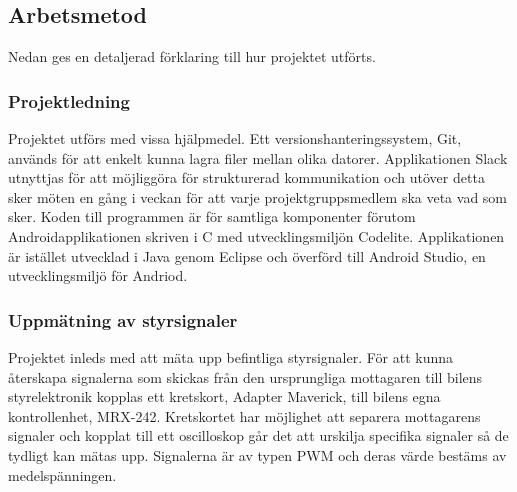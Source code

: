 \documentclass[a4paper]{article}
\begin{document}

\subsection{Arbetsmetod}
Nedan ges en detaljerad förklaring till hur projektet utförts. 

\subsubsection{Projektledning}
Projektet utförs med vissa hjälpmedel. Ett versionshanteringssystem, Git, används för att enkelt kunna lagra filer mellan olika datorer. Applikationen Slack utnyttjas för att möjliggöra för strukturerad kommunikation och utöver detta sker möten en gång i veckan för att varje projektgruppsmedlem ska veta vad som sker. Koden till programmen är för samtliga komponenter förutom Androidapplikationen skriven i C med utvecklingsmiljön Codelite. Applikationen är istället utvecklad i Java genom Eclipse och överförd till Android Studio, en utvecklingsmiljö för Andriod.

\subsubsection{Uppmätning av styrsignaler}
Projektet inleds med att mäta upp befintliga styrsignaler. För att kunna återskapa signalerna som skickas från den ursprungliga mottagaren till bilens styrelektronik kopplas ett kretskort, Adapter Maverick, till bilens egna kontrollenhet, MRX-242. Kretskortet har möjlighet att separera mottagarens signaler och kopplat till ett oscilloskop går det att urskilja specifika signaler så de tydligt kan mätas upp. Signalerna är av typen PWM och deras värde bestäms av medelspänningen. 
\end{document}

